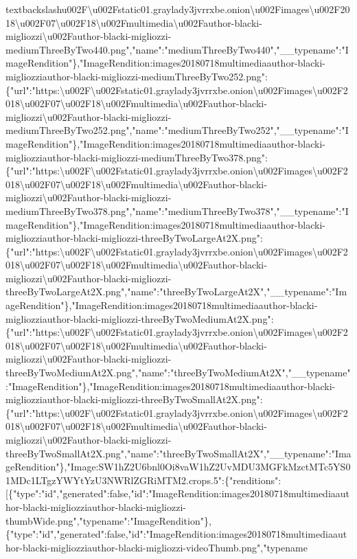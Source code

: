 textbackslash{}u002F\textbackslash{}u002Fstatic01.graylady3jvrrxbe.onion\textbackslash{}u002Fimages\textbackslash{}u002F2018\textbackslash{}u002F07\textbackslash{}u002F18\textbackslash{}u002Fmultimedia\textbackslash{}u002Fauthor-blacki-migliozzi\textbackslash{}u002Fauthor-blacki-migliozzi-mediumThreeByTwo440.png","name":"mediumThreeByTwo440","\_\_typename":"ImageRendition"\},"ImageRendition:images20180718multimediaauthor-blacki-migliozziauthor-blacki-migliozzi-mediumThreeByTwo252.png":\{"url":"https:\textbackslash{}u002F\textbackslash{}u002Fstatic01.graylady3jvrrxbe.onion\textbackslash{}u002Fimages\textbackslash{}u002F2018\textbackslash{}u002F07\textbackslash{}u002F18\textbackslash{}u002Fmultimedia\textbackslash{}u002Fauthor-blacki-migliozzi\textbackslash{}u002Fauthor-blacki-migliozzi-mediumThreeByTwo252.png","name":"mediumThreeByTwo252","\_\_typename":"ImageRendition"\},"ImageRendition:images20180718multimediaauthor-blacki-migliozziauthor-blacki-migliozzi-mediumThreeByTwo378.png":\{"url":"https:\textbackslash{}u002F\textbackslash{}u002Fstatic01.graylady3jvrrxbe.onion\textbackslash{}u002Fimages\textbackslash{}u002F2018\textbackslash{}u002F07\textbackslash{}u002F18\textbackslash{}u002Fmultimedia\textbackslash{}u002Fauthor-blacki-migliozzi\textbackslash{}u002Fauthor-blacki-migliozzi-mediumThreeByTwo378.png","name":"mediumThreeByTwo378","\_\_typename":"ImageRendition"\},"ImageRendition:images20180718multimediaauthor-blacki-migliozziauthor-blacki-migliozzi-threeByTwoLargeAt2X.png":\{"url":"https:\textbackslash{}u002F\textbackslash{}u002Fstatic01.graylady3jvrrxbe.onion\textbackslash{}u002Fimages\textbackslash{}u002F2018\textbackslash{}u002F07\textbackslash{}u002F18\textbackslash{}u002Fmultimedia\textbackslash{}u002Fauthor-blacki-migliozzi\textbackslash{}u002Fauthor-blacki-migliozzi-threeByTwoLargeAt2X.png","name":"threeByTwoLargeAt2X","\_\_typename":"ImageRendition"\},"ImageRendition:images20180718multimediaauthor-blacki-migliozziauthor-blacki-migliozzi-threeByTwoMediumAt2X.png":\{"url":"https:\textbackslash{}u002F\textbackslash{}u002Fstatic01.graylady3jvrrxbe.onion\textbackslash{}u002Fimages\textbackslash{}u002F2018\textbackslash{}u002F07\textbackslash{}u002F18\textbackslash{}u002Fmultimedia\textbackslash{}u002Fauthor-blacki-migliozzi\textbackslash{}u002Fauthor-blacki-migliozzi-threeByTwoMediumAt2X.png","name":"threeByTwoMediumAt2X","\_\_typename":"ImageRendition"\},"ImageRendition:images20180718multimediaauthor-blacki-migliozziauthor-blacki-migliozzi-threeByTwoSmallAt2X.png":\{"url":"https:\textbackslash{}u002F\textbackslash{}u002Fstatic01.graylady3jvrrxbe.onion\textbackslash{}u002Fimages\textbackslash{}u002F2018\textbackslash{}u002F07\textbackslash{}u002F18\textbackslash{}u002Fmultimedia\textbackslash{}u002Fauthor-blacki-migliozzi\textbackslash{}u002Fauthor-blacki-migliozzi-threeByTwoSmallAt2X.png","name":"threeByTwoSmallAt2X","\_\_typename":"ImageRendition"\},"Image:SW1hZ2U6bnl0Oi8vaW1hZ2UvMDU3MGFkMzctMTc5YS01MDc1LTgzYWYtYzU3NWRlZGRiMTM2.crops.5":\{"renditions":{[}\{"type":"id","generated":false,"id":"ImageRendition:images20180718multimediaauthor-blacki-migliozziauthor-blacki-migliozzi-thumbWide.png","typename":"ImageRendition"\},\{"type":"id","generated":false,"id":"ImageRendition:images20180718multimediaauthor-blacki-migliozziauthor-blacki-migliozzi-videoThumb.png","typename